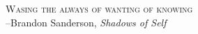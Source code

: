 \thispagestyle{empty}
\hbox{}
\vspace{30mm}
\begin{flushright}
{\LARGE\scshape Wasing the always of wanting of knowing}\\[.5\baselineskip]
{\footnotesize --Brandon Sanderson, \textit{Shadows of Self}}
\end{flushright}
\vfill
\hbox{}
\enlargethispage{30mm}
\vfill
\begin{figure}[b]
  \centering
\resizebox{22.5mm}{!}{}
\end{figure}
\restoregeometry